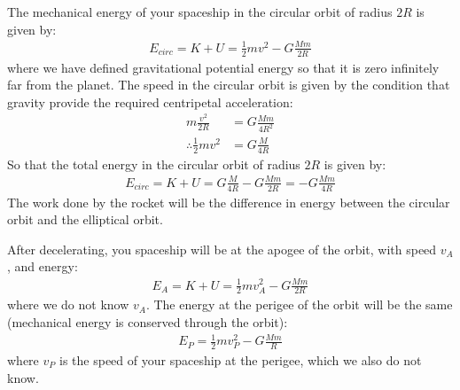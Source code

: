\begin{solution}
The mechanical energy of your spaceship in the circular orbit of radius $2R$ is given by:
\begin{align*}
E_{circ}=K+U=\frac{1}{2}mv^2-G\frac{Mm}{2R}
\end{align*}
where we have defined gravitational potential energy so that it is zero infinitely far from the planet. The speed in the circular orbit is given by the condition that gravity provide the required centripetal acceleration:
\begin{align*}
m\frac{v^2}{2R}&=G\frac{Mm}{4R^2}\\
\therefore \frac{1}{2}mv^2&=G\frac{M}{4R}
\end{align*}
So that the total energy in the circular orbit of radius $2R$ is given by:
\begin{align*}
E_{circ}=K+U=G\frac{M}{4R}-G\frac{Mm}{2R}=-G\frac{Mm}{4R}
\end{align*}
The work done by the rocket will be the difference in energy between the circular orbit and the elliptical orbit.

After decelerating, you spaceship will be at the apogee of the orbit, with speed $v_A$, and energy:
\begin{align*}
E_A=K+U=\frac{1}{2}mv_A^2-G\frac{Mm}{2R}
\end{align*}
where we do not know $v_A$. The energy at the perigee of the orbit will be the same (mechanical energy is conserved through the orbit):
\begin{align*}
E_P=\frac{1}{2}mv_P^2-G\frac{Mm}{R}
\end{align*}
where $v_P$ is the speed of your spaceship at the perigee, which we also do not know.


\end{solution}
